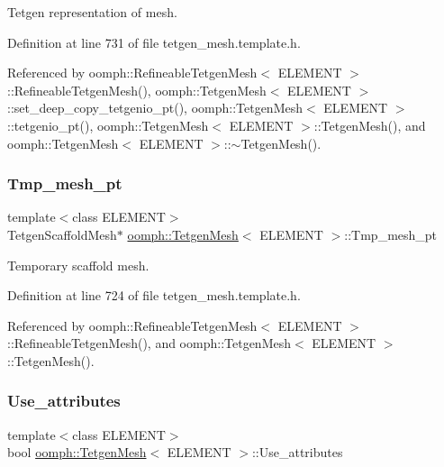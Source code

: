 Tetgen representation of mesh. 



Definition at line 731 of file tetgen\+\_\+mesh.\+template.\+h.



Referenced by oomph\+::\+Refineable\+Tetgen\+Mesh$<$ E\+L\+E\+M\+E\+N\+T $>$\+::\+Refineable\+Tetgen\+Mesh(), oomph\+::\+Tetgen\+Mesh$<$ E\+L\+E\+M\+E\+N\+T $>$\+::set\+\_\+deep\+\_\+copy\+\_\+tetgenio\+\_\+pt(), oomph\+::\+Tetgen\+Mesh$<$ E\+L\+E\+M\+E\+N\+T $>$\+::tetgenio\+\_\+pt(), oomph\+::\+Tetgen\+Mesh$<$ E\+L\+E\+M\+E\+N\+T $>$\+::\+Tetgen\+Mesh(), and oomph\+::\+Tetgen\+Mesh$<$ E\+L\+E\+M\+E\+N\+T $>$\+::$\sim$\+Tetgen\+Mesh().

\mbox{\label{classoomph_1_1TetgenMesh_ac11e90fcf927bbf8317800db7723bad2}} 
\subsubsection{\texorpdfstring{Tmp\+\_\+mesh\+\_\+pt}{Tmp\_mesh\_pt}}
{\footnotesize\ttfamily template$<$class E\+L\+E\+M\+E\+NT$>$ \\
Tetgen\+Scaffold\+Mesh$\ast$ \hyperlink{classoomph_1_1TetgenMesh}{oomph\+::\+Tetgen\+Mesh}$<$ E\+L\+E\+M\+E\+NT $>$\+::Tmp\+\_\+mesh\+\_\+pt\hspace{0.3cm}{\ttfamily [protected]}}



Temporary scaffold mesh. 



Definition at line 724 of file tetgen\+\_\+mesh.\+template.\+h.



Referenced by oomph\+::\+Refineable\+Tetgen\+Mesh$<$ E\+L\+E\+M\+E\+N\+T $>$\+::\+Refineable\+Tetgen\+Mesh(), and oomph\+::\+Tetgen\+Mesh$<$ E\+L\+E\+M\+E\+N\+T $>$\+::\+Tetgen\+Mesh().

\mbox{\label{classoomph_1_1TetgenMesh_a94c4ac3940ecfdd87679167d300ce75d}} 
\subsubsection{\texorpdfstring{Use\+\_\+attributes}{Use\_attributes}}
{\footnotesize\ttfamily template$<$class E\+L\+E\+M\+E\+NT$>$ \\
bool \hyperlink{classoomph_1_1TetgenMesh}{oomph\+::\+Tetgen\+Mesh}$<$ E\+L\+E\+M\+E\+NT $>$\+::Use\+\_\+attributes\hspace{0.3cm}{\ttfamily [protected]}}



